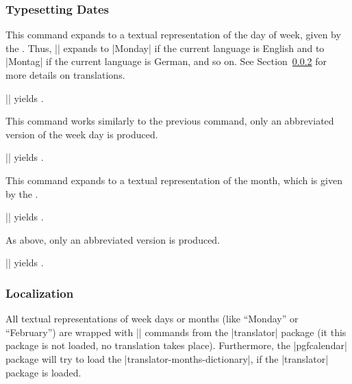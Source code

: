 \subsubsection{Typesetting Dates}




\begin{command}{\pgfcalendarweekdayname{}}
  This command expands to a textual representation of the day of week,
  given by the . Thus,
  || expands to |Monday| if the current
  language is English and to |Montag| if the current language is
  German, and so on. See Section~\ref{section-calendar-locale} for
  more details on translations.

  \example || yields
  \texttt{}.
\end{command}


\begin{command}{\pgfcalendarweekdayshortname{}}
  This command works similarly to the previous command, only an
  abbreviated version of the week day is produced.

  \example || yields
  \texttt{}.
\end{command}


\begin{command}{\pgfcalendarmonthname{}}
  This command expands to a textual representation of the month, which
  is given by the .

  \example || yields
  \texttt{}.
\end{command}


\begin{command}{\pgfcalendarmonthshortname{}}
  As above, only an abbreviated version is produced.

  \example || yields
  \texttt{}.
\end{command}



\subsubsection{Localization}

\label{section-calendar-locale}
All textual representations of week days or months (like ``Monday'' or
``February'') are wrapped with |\translate| commands from the
|translator| package (it this package is not loaded, no translation
takes place). Furthermore, the |pgfcalendar| package will try to load
the |translator-months-dictionary|, if the |translator| package is
loaded.

